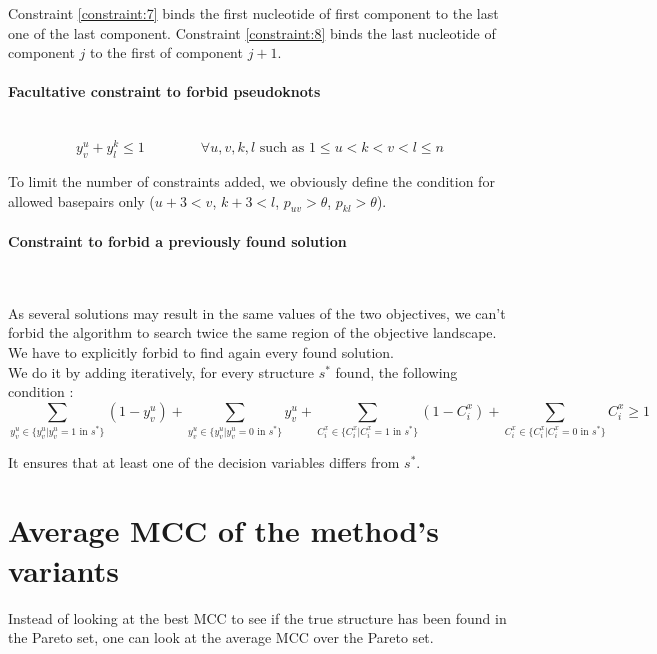 \documentclass{article}
\begin{document}
Constraint \ref{constraint:7} binds the first nucleotide of first component to the last one of the last component. 
Constraint \ref{constraint:8} binds the last nucleotide of component $j$ to the first of component $j+1$.

\paragraph{Facultative constraint to forbid pseudoknots} ~
\begin{equation}\label{constraint:9}
	y^u_v + y^k_l \leq 1 \qquad \qquad \forall u,v,k,l \text{ such as } 1\leq u<k<v<l\leq n
\end{equation}

To limit the number of constraints added, we obviously define the condition for allowed basepairs only ($u + 3 <v$, $k + 3 <l$, $p_{uv} > \theta$, $p_{kl} > \theta$).



\paragraph{Constraint to forbid a previously found solution} ~ 

As several solutions may result in the same values of the two objectives, we can't forbid the algorithm to search twice the same region of the objective landscape.
We have to explicitly forbid to find again every found solution.\\
We do it by adding iteratively, for every structure $s^*$ found, the following condition :
\begin{equation}\label{constraint:10}
	\sum_{y^u_v \in \{ y^u_v  | y^u_v = 1 \text{ in } s^* \}} (1 - y^u_v) + \sum_{y^u_v \in \{ y^u_v  | y^u_v = 0 \text{ in } s^* \}} y^u_v +
	\sum_{C^x_i \in \{ C^x_i  | C^x_i = 1 \text{ in } s^* \}} (1 - C^x_i) + \sum_{C^x_i \in \{ C^x_i  |C^x_i = 0 \text{ in } s^* \}} C^x_i \geq 1
\end{equation}

It ensures that at least one of the decision variables differs from $s^*$.

\section{Average MCC of the method's variants}
Instead of looking at the best MCC to see if the true structure has been found in the Pareto set, one can look at the average MCC over the Pareto set.
\end{document}

